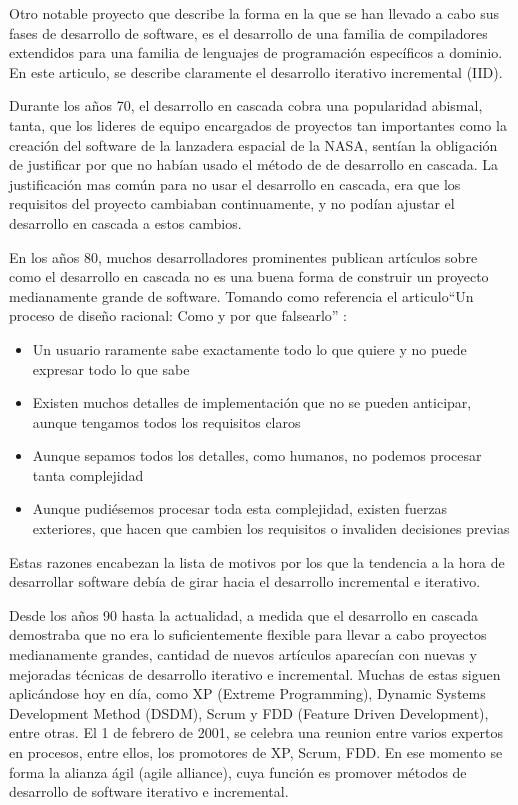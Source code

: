 \documentclass[12pt]{report} %
\begin{document}
Otro notable proyecto que describe la forma en la que se han llevado a cabo sus
fases de desarrollo de software, es el desarrollo de una familia de compiladores
extendidos para una familia de lenguajes de programación específicos a dominio.
En este articulo, se describe claramente el desarrollo iterativo incremental
(IID). \cite{6312870}

Durante los años 70, el desarrollo en cascada cobra una popularidad abismal,
tanta, que los lideres de equipo encargados de proyectos tan importantes como la
creación del software de la lanzadera espacial de la NASA, sentían la obligación
de justificar por que no habían usado el método de de desarrollo en cascada.  La
justificación mas común para no usar el desarrollo en cascada, era que los
requisitos del proyecto cambiaban continuamente, y no podían ajustar el
desarrollo en cascada a estos cambios.

En los años 80, muchos desarrolladores prominentes publican artículos sobre como
el desarrollo en cascada no es una buena forma de construir un proyecto
medianamente grande de software.  Tomando como referencia el articulo``Un
proceso de diseño racional: Como y por que falsearlo'' \cite{Parnas1986}:
\begin{itemize} \item{Un usuario raramente sabe exactamente todo lo que quiere y
    no puede expresar todo lo que sabe} \item{Existen muchos detalles de
      implementación que no se pueden anticipar, aunque tengamos todos los
    requisitos claros} \item{Aunque sepamos todos los detalles, como humanos, no
    podemos procesar tanta complejidad} \item{Aunque pudiésemos procesar toda
      esta complejidad, existen fuerzas exteriores, que hacen que cambien los
requisitos o invaliden decisiones previas} \end{itemize} Estas razones encabezan
la lista de motivos por los que la tendencia a la hora de desarrollar software
debía de girar hacia el desarrollo incremental e iterativo.

Desde los años 90 hasta la actualidad, a medida que el desarrollo en cascada
demostraba que no era lo suficientemente flexible para llevar a cabo proyectos
medianamente grandes, cantidad de nuevos artículos aparecían con nuevas y
mejoradas técnicas de desarrollo iterativo e incremental.  Muchas de estas
siguen aplicándose hoy en día, como XP (Extreme Programming), Dynamic Systems
Development Method (DSDM), Scrum y FDD (Feature Driven Development), entre
otras.  El 1 de febrero de 2001, se celebra una reunion entre varios expertos en
procesos, entre ellos, los promotores de XP, Scrum, FDD.  En ese momento se
forma la alianza ágil (agile alliance), cuya función es promover métodos de
desarrollo de software iterativo e incremental. 
\end{document}
